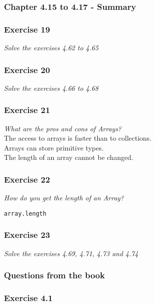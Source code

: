 \subsubsection{Chapter 4.15 to 4.17 - Summary}

\subsubsection*{Exercise 19}
\textit{Solve the exercises 4.62 to 4.65}\\

\subsubsection*{Exercise 20}
\textit{Solve the exercises 4.66 to 4.68}\\

\subsubsection*{Exercise 21}
\textit{What are the pros and cons of Arrays?}\\
The access to arrays is faster than to collections. \\
Arrays can store primitive types. \\
The length of an array cannot be changed. 

\subsubsection*{Exercise 22}
\textit{How do you get the length of an Array?}\\
\begin{lstlisting}
array.length
\end{lstlisting}

\subsubsection*{Exercise 23}
\textit{Solve the exercises 4.69, 4.71, 4.73 and 4.74}\\

\subsubsection{Questions from the book}

\subsubsection{Exercise 4.1}

